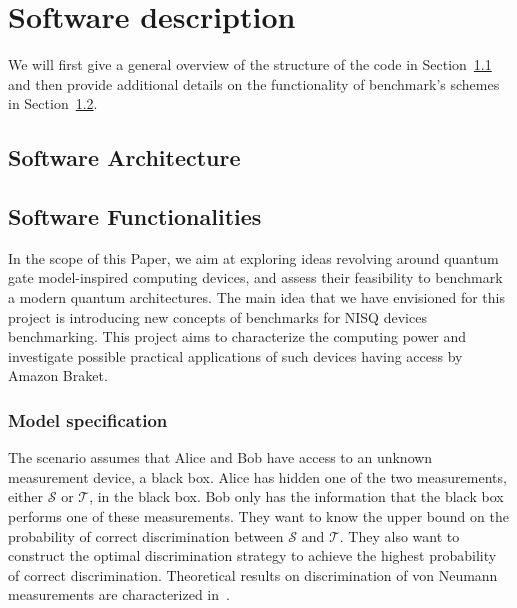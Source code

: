 \documentclass[preprint,12pt, a4paper]{elsarticle}
\newcommand{\1}{{\rm 1\hspace{-0.9mm}l}}
\newcommand{\TT}{\mathcal{T}}
\renewcommand{\SS}{\mathcal{S}}
\begin{document}
\section{Software description}
\label{}

We will first give a general overview of the structure of the code in 
Section~\ref{sec:sortware-architecture} and then provide additional details on 
the functionality of benchmark's schemes  in 
Section~\ref{sec:sortware-functionalities}.

\subsection{Software Architecture}\label{sec:sortware-architecture}
\label{}


\subsection{Software Functionalities}\label{sec:sortware-functionalities}

In the scope of this Paper, we aim at  exploring ideas revolving around quantum 
gate model-inspired computing devices, and assess their feasibility to 
benchmark a modern quantum architectures. The main idea that we have envisioned 
for this project is  introducing new concepts of benchmarks for NISQ devices 
benchmarking. This project aims to characterize the computing power and 
investigate possible practical applications of such devices having access by 
Amazon Braket. 





\subsubsection{Model specification}
The scenario assumes that Alice and Bob have access to an unknown measurement
device, a black box. Alice has hidden one of the two measurements, either $\SS$
or $\TT$, in the black box. Bob only has the information that the black box
performs one of these measurements. They want to know the upper bound on the
probability of correct discrimination between $\SS$ and $\TT$. They also want to
construct the optimal discrimination strategy to achieve the highest probability
of correct discrimination. Theoretical results on discrimination of von Neumann
measurements are characterized in~\cite{puchala2018strategies}.
\end{document}
